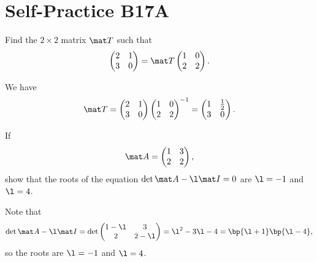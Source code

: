 \section{Self-Practice B17A}

\begin{problem}
    Find the $2 \times 2$ matrix $\mat T$ such that \[\begin{pmatrix}2 & 1 \\ 3 & 0\end{pmatrix} = \mat T \begin{pmatrix}1 & 0 \\ 2 & 2\end{pmatrix}.\]
\end{problem}
\begin{solution}
    We have \[\mat T = \begin{pmatrix}2 & 1 \\ 3 & 0\end{pmatrix}\begin{pmatrix}1 & 0 \\ 2 & 2\end{pmatrix}^{-1} = \begin{pmatrix}1 & \frac12 \\ 3 & 0\end{pmatrix}.\]
\end{solution}

\begin{problem}
    If \[\mat A = \begin{pmatrix}1 & 3 \\ 2 & 2\end{pmatrix},\] show that the roots of the equation $\det{\mat A - \l \mat I} = 0$ are $\l = -1$ and $\l = 4$.
\end{problem}
\begin{solution}
    Note that \[\det{\mat A - \l \mat I} = \det \begin{pmatrix}1 - \l & 3 \\ 2 & 2 - \l\end{pmatrix} = \l^2 - 3\l - 4 = \bp{\l + 1}\bp{\l - 4},\] so the roots are $\l = -1$ and $\l = 4$.
\end{solution}

